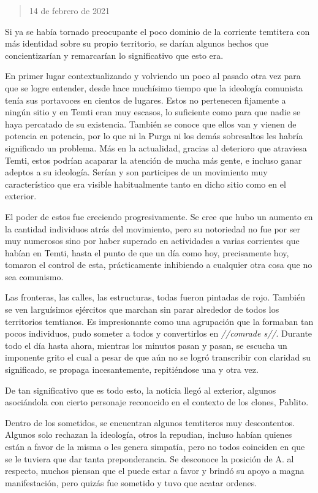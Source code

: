 \documentclass[
  spanish,
]{book}
\begin{document}
\begin{quote}
14 de febrero de 2021
\end{quote}

Si ya se había tornado preocupante el poco dominio de la corriente temtitera con más identidad sobre su propio territorio, se darían algunos hechos que concientizarían y remarcarían lo significativo que esto era.

En primer lugar contextualizando y volviendo un poco al pasado otra vez para que se logre entender, desde hace muchísimo tiempo que la ideología comunista tenía sus portavoces en cientos de lugares. Estos no pertenecen fijamente a ningún sitio y en Temti eran muy escasos, lo suficiente como para que nadie se haya percatado de su existencia. También se conoce que ellos van y vienen de potencia en potencia, por lo que ni la Purga ni los demás sobresaltos les habría significado un problema.
Más en la actualidad, gracias al deterioro que atraviesa Temti, estos podrían acaparar la atención de mucha más gente, e incluso ganar adeptos a su ideología. Serían y son participes de un movimiento muy característico que era visible habitualmente tanto en dicho sitio como en el exterior.

El poder de estos fue creciendo progresivamente. Se cree que hubo un aumento en la cantidad individuos atrás del movimiento, pero su notoriedad no fue por ser muy numerosos sino por haber superado en actividades a varias corrientes que habían en Temti, hasta el punto de que un día como hoy, precisamente hoy, tomaron el control de esta, prácticamente inhibiendo a cualquier otra cosa que no sea comunismo.

Las fronteras, las calles, las estructuras, todas fueron pintadas de rojo. También se ven larguísimos ejércitos que marchan sin parar alrededor de todos los territorios temtianos. Es impresionante como una agrupación que la formaban tan pocos individuos, pudo someter a todos y convertirlos en \emph{//comrade s//}. Durante todo el día hasta ahora, mientras los minutos pasan y pasan, se escucha un imponente grito el cual a pesar de que aún no se logró transcribir con claridad su significado, se propaga incesantemente, repitiéndose una y otra vez.

De tan significativo que es todo esto, la noticia llegó al exterior, algunos asociándola con cierto personaje reconocido en el contexto de los clones, Pablito.

Dentro de los sometidos, se encuentran algunos temtiteros muy descontentos. Algunos solo rechazan la ideología, otros la repudian, incluso habían quienes están a favor de la misma o les genera simpatía, pero no todos coinciden en que se le tuviera que dar tanta preponderancia. Se desconoce la posición de A. al respecto, muchos piensan que el puede estar a favor y brindó su apoyo a magna manifestación, pero quizás fue sometido y tuvo que acatar ordenes.
\end{document}
